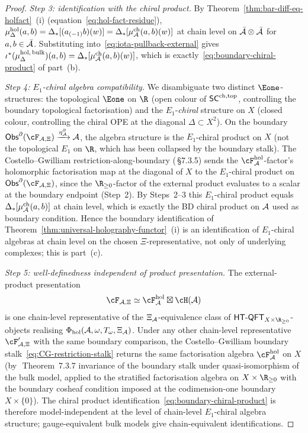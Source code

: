 \begin{proof}
\emph{Step 3: identification with the chiral product.}
By Theorem~\ref{thm:bar-diff-eq-holfact}~(i)
(equation~\eqref{eq:hol-fact-residue}),
$\mu^{\mathrm{hol}}_\Delta(a,b) = \Delta_*[(a_{(-1)}b)(w)] =
\Delta_*[\mu^{\mathrm{ch}}_{\mathcal{A}}(a,b)(w)]$ at chain level on
$\bar{\mathcal{A}} \otimes \bar{\mathcal{A}}$ for $a, b \in \bar{\mathcal{A}}$. Substituting
into~\eqref{eq:iota-pullback-external} gives
$\iota^*(\mu^{\mathrm{hol},\,\mathrm{bulk}}_\Delta)(a,b) =
\Delta_*[\mu^{\mathrm{ch}}_{\mathcal{A}}(a,b)(w)]$, which is
exactly~\eqref{eq:boundary-chiral-product} of part~(b).

\emph{Step 4: $E_1$-chiral algebra compatibility.}
We disambiguate two distinct $\Eone$-structures: the topological
$\Eone$ on $\R$ (open colour of $\mathsf{SC}^{\mathrm{ch},\mathrm{top}}$, controlling the
boundary topological factorisation) and the $E_1$-\emph{chiral}
structure on $X$ (closed colour, controlling the chiral OPE at
the diagonal $\Delta\subset X^2$). On the boundary
\(\Obs^\partial(\cF_{\cA,\Xi})\xrightarrow{\eta^\partial_\cA}\cA\),
the algebra structure is the
$E_1$-chiral product on $X$ (not the topological $E_1$ on $\R$,
which has been collapsed by the boundary stalk). The
Costello--Gwilliam restriction-along-boundary
(\cite{CG21}\,\S7.3.5) sends the $\cF_\cA^{\mathrm{hol}}$-factor's
holomorphic factorisation map at the diagonal of $X$ to the
$E_1$-chiral product on \(\Obs^\partial(\cF_{\cA,\Xi})\), since the
$\R_{\geq 0}$-factor of the external product evaluates to a scalar at
the boundary endpoint (Step~2). By Steps~2--3 this
$E_1$-chiral product equals
$\Delta_*[\mu^{\mathrm{ch}}_{\mathcal{A}}(a,b)]$ at chain level, which is
exactly the BD chiral product on $\mathcal{A}$ used as boundary
condition. Hence the boundary identification of
Theorem~\ref{thm:universal-holography-functor}~(i) is an
identification of $E_1$-chiral algebras at chain level on the chosen
\(\Xi\)-representative, not only of underlying complexes; this is
part~(c).

\emph{Step 5: well-definedness independent of product
presentation.}
The external-product presentation
\[
\cF_{\cA,\Xi}\simeq
\cF_\cA^{\mathrm{hol}} \boxtimes \cH(\cA)
\]
is one chain-level representative of the \(\Xi_{\mathcal{A}}\)-equivalence
class of \(\HTQFT_{X \times \R_{\geq 0}}\)-objects realising
\(\Phi_{\mathrm{hol}}(\mathcal{A},\omega,T_\omega,\Xi_{\mathcal{A}})\). Under any other
chain-level representative
\(\cF'_{\cA,\Xi}\) with the same boundary comparison, the
Costello--Gwilliam
boundary stalk~\eqref{eq:CG-restriction-stalk} returns the same
factorisation algebra $\cF^{\mathrm{hol}}_\cA$ on $X$
(by~\cite{CG21}\,Theorem~7.3.7 invariance of the boundary stalk
under quasi-isomorphism of the bulk model, applied to the
stratified factorisation algebra on $X \times \R_{\geq 0}$ with
the boundary cosheaf condition imposed at the codimension-one
boundary $X\times\{0\}$). The chiral product
identification~\eqref{eq:boundary-chiral-product} is therefore
model-independent at the level of chain-level $E_1$-chiral algebra
structure; gauge-equivalent bulk models give chain-equivalent
identifications.


\end{proof}
